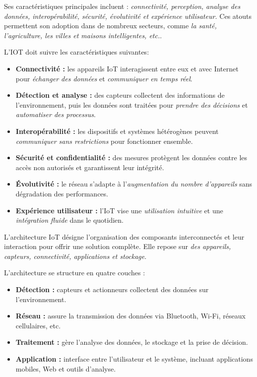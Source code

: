 Ses caractéristiques principales incluent : \emph{connectivité, perception, analyse des données, interopérabilité, sécurité, évolutivité et expérience utilisateur.} Ces atouts permettent son adoption dans de nombreux secteurs, comme \emph{la santé, l'agriculture, les villes et maisons intelligentes, etc.}.

L'IOT doit suivre les caractéristiques suivantes:

\begin{itemize}
  \item \textbf{Connectivité :} les appareils IoT interagissent entre eux et avec 
  Internet pour \textit{échanger des données} et \textit{communiquer en temps réel}.  
  \item \textbf{Détection et analyse :} des capteurs collectent des informations de 
  l'environnement, puis les données sont traitées pour \textit{prendre des décisions} 
  et \textit{automatiser des processus}.  
  \item \textbf{Interopérabilité :} les dispositifs et systèmes hétérogènes 
  peuvent \textit{communiquer sans restrictions} pour fonctionner ensemble.  
  \item \textbf{Sécurité et confidentialité :} des mesures protègent les données 
  contre les accès non autorisés et garantissent leur intégrité.  
  \item \textbf{Évolutivité :} le réseau s'adapte à l'\textit{augmentation du 
  nombre d'appareils} sans dégradation des performances.  
  \item \textbf{Expérience utilisateur :} l'IoT vise une \textit{utilisation 
  intuitive} et une \textit{intégration fluide} dans le quotidien.
\end{itemize}


L'architecture IoT désigne l'organisation des composants interconnectés et leur interaction pour offrir une solution complète. Elle repose sur \textit{des appareils, capteurs, connectivité, applications et stockage}.  

L'architecture se structure en quatre couches :  
\begin{itemize}
  \item \textbf{Détection :} capteurs et actionneurs collectent des données sur l'environnement.  
  \item \textbf{Réseau :} assure la transmission des données via Bluetooth, Wi-Fi, réseaux cellulaires, etc.  
  \item \textbf{Traitement :} gère l'analyse des données, le stockage et la prise de décision.  
  \item \textbf{Application :} interface entre l'utilisateur et le système, incluant applications mobiles, Web et outils d'analyse.  
\end{itemize}

